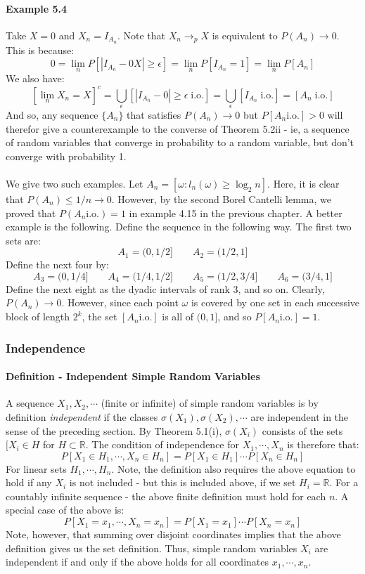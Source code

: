 \documentclass[12pt,a4paper]{article}
\newcommand{\1}[1]{\mathbbm{1}\left\{ #1 \right\}}
\newcommand{\R}{\mathbb{R}}
\newcommand{\io}{\text{i.o.}}
\begin{document}
\paragraph{Example 5.4} Take $X = 0$ and $X_n = I_{A_n}$. Note that $X_n \to_p X$ is equivalent to $P(A_n) \to 0$. This is because:
$$
	0 = \lim_n P\left[|I_{A_n} - 0X| \geq \epsilon\right] = \lim_n P\left[I_{A_n} = 1\right] = \lim_n P\left[A_n\right]
$$
We also have:
$$
	\left[\lim_n X_n = X\right]^c = \bigcup_\epsilon \left[|I_{A_n} - 0| \geq \epsilon \;\io\right] = 
	\bigcup_\epsilon \left[I_{A_n} \;\io\right] =
	\left[A_n \;\io\right]
$$
And so, any sequence $\{A_n\}$ that satisfies $P(A_n) \to 0$ but $P[A_n \io] > 0$ will therefor give a counterexample to the converse of Theorem 5.2ii - ie, a sequence of random variables that converge in probability to a random variable, but don't converge with probability 1. 
\\\\
We give two such examples. Let $A_n = [\omega : l_n(\omega) \geq \log_2 n]$. Here, it is clear that $P(A_n) \leq 1/n \to 0$. However, by the second Borel Cantelli lemma, we proved that $P(A_n \io) = 1$ in example 4.15 in the previous chapter. A better example is the following. Define the sequence in the following way. The first two sets are:
$$
	A_1 = (0,1/2] \quad\quad A_2 = (1/2,1]
$$
Define the next four by:
$$
	A_3 = (0,1/4] \quad\quad A_4 = (1/4,1/2] \quad\quad A_5 = (1/2,3/4] \quad\quad A_6 = (3/4,1]
$$
Define the next eight as the dyadic intervals of rank 3, and so on. Clearly, $P(A_n) \to 0$. However, since each point $\omega$ is covered by one set in each successive block of length $2^k$, the set $[A_n \io]$ is all of $(0,1]$, and so $P[A_n \io] = 1$. 

\subsubsection{Independence}
\paragraph{Definition - Independent Simple Random Variables} A sequence $X_1, X_2, \cdots$ (finite or infinite) of simple random variables is by definition \textit{independent} if the classes $\sigma(X_1), \sigma(X_2), \cdots$ are independent in the sense of the preceding section. By Theorem 5.1(i), $\sigma(X_i)$ consists of the sets $[X_i \in H$ for $H \subset \R$. The condition of independence for $X_1, \cdots, X_n$ is therefore that:
$$
	P[X_1 \in H_1, \cdots, X_n \in H_n] = P[X_1 \in H_1] \cdots P[X_n \in H_n]
$$
For linear sets $H_1, \cdots, H_n$. Note, the definition also requires the above equation to hold if any $X_i$ is not included - but this is included above, if we set $H_i = \R$. For a countably infinite sequence - the above finite definition must hold for each $n$. A special case of the above is:
$$
	P[X_1 = x_1, \cdots, X_n = x_n] = P[X_1 = x_1] \cdots P[X_n = x_n]
$$
Note, however, that summing over disjoint coordinates implies that the above definition gives us the set definition. Thus, simple random variables $X_i$ are independent if and only if the above holds for all coordinates $x_1, \cdots, x_n$.
\end{document}
